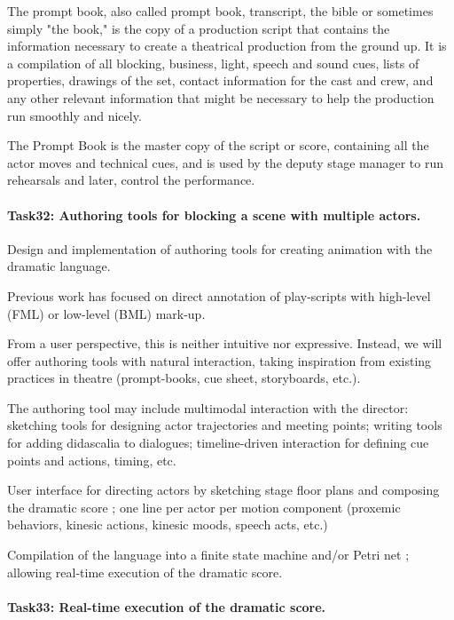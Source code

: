 The prompt book, also called prompt book, transcript, the bible or sometimes simply "the book," is the copy of a production script that contains the information necessary to create a theatrical production from the ground up. It is a compilation of all blocking, business, light, speech and sound cues, lists of properties, drawings of the set, contact information for the cast and crew, and any other relevant information that might be necessary to help the production run smoothly and nicely.


The Prompt Book is the master copy of the script or score, containing all the actor moves and technical cues, 
and is used by the deputy stage manager to run rehearsals and later, control the performance.



\paragraph{Task32: Authoring tools for blocking a scene with multiple actors.}

Design and implementation of authoring tools for creating animation with the dramatic language.

Previous work has focused on direct annotation of play-scripts with high-level (FML) or low-level (BML) mark-up.

From a user perspective, this is neither intuitive nor expressive. Instead, we will offer authoring tools
with natural interaction, taking inspiration from existing practices in theatre (prompt-books, cue sheet, storyboards, etc.).


The authoring tool may include multimodal interaction with the director: sketching tools for designing actor trajectories
and meeting points; writing tools for adding didascalia to dialogues; timeline-driven interaction for defining cue points
and actions, timing, etc.

User interface for directing actors by sketching stage floor plans and composing the dramatic score ; one line per actor per motion component (proxemic behaviors, kinesic actions, kinesic moods, speech acts, etc.)

Compilation of the language into a finite state machine and/or Petri net ; allowing real-time execution of the dramatic score.



\paragraph{Task33: Real-time execution of the dramatic score.} 


